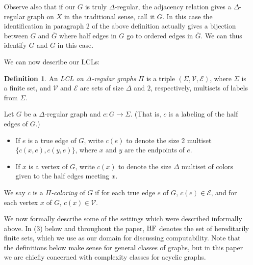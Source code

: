 \documentclass[10pt,a4paper]{amsart}
\theoremstyle{definition}
\newtheorem{definition}[theorem]{Definition}
\newcommand{\HF}{\textnormal{HF}}
\begin{document}
Observe also that if our $G$ is truly $\Delta$-regular, the adjacency relation gives a $\Delta$-regular graph on $X$ in the traditional sense, call it $\overline{G}$. In this case the identification in paragraph 2 of the above definition actually gives a bijection between $G$ and $\overline{G}$ where half edges in $G$ go to ordered edges in $\overline{G}$. We can thus identify $G$ and $\overline{G}$ in this case.

We can now describe our LCLs:

\begin{definition}\label{def:lcl}
	An \textit{LCL on $\Delta$-regular graphs} $\Pi$ is a triple $(\Sigma,\mathcal{V},\mathcal{E})$, where $\Sigma$ is a finite set, and $\mathcal{V}$ and $\mathcal{E}$ are sets of size $\Delta$ and $2$, respectively, multisets of labels from $\Sigma$. 
	
	Let $G$ be a $\Delta$-regular graph and $c:G \rightarrow \Sigma$. (That is, $c$ is a labeling of the half edges of $G$.)
	    \begin{itemize}
	        \item If $e$ is a true edge of $G$, write $c(e)$ to denote the size 2 multiset $\{c(x,e),c(y,e)\}$, where $x$ and $y$ are the endpoints of $e$.
	        \item If $x$ is a vertex of $G$, write $c(x)$ to denote the size $\Delta$ multiset of colors given to the half edges meeting $x$.
	    \end{itemize}
    We say $c$ is a \textit{$\Pi$-coloring} of $G$ if for each true edge $e$ of $G$, $c(e) \in \mathcal{E}$, and for each vertex $x$ of $G$, $c(x) \in \mathcal{V}$.
\end{definition}

We now formally describe some of the settings which were described informally above. In (3) below and throughout the paper, $\HF$ denotes the set of hereditarily finite sets, which we use as our domain for discussing computability. Note that the definitions below make sense for general classes of graphs, but in this paper we are chiefly concerned with complexity classes for acyclic graphs.
\end{document}
